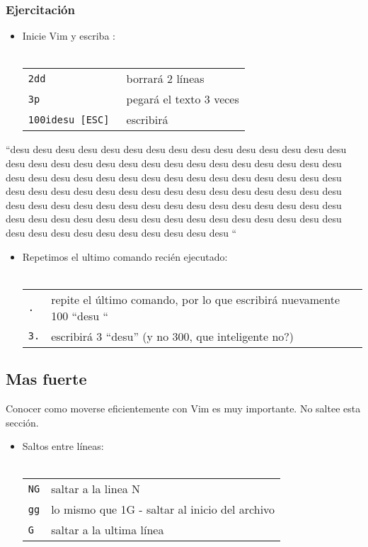 \documentclass[12pt]{article}
\begin{document}
\subsubsection{Ejercitación}


\begin{itemize}
	\item Inicie Vim y escriba : \\ \\
\begin{tabular}{ l l }
	\texttt{2dd} & borrará 2 líneas \\
	\texttt{3p} & pegará el texto 3 veces \\
	\texttt{100idesu [ESC] } & escribirá \\
\end{tabular}
\end{itemize}
“desu desu desu desu desu desu desu desu desu desu desu desu desu desu desu desu desu desu desu desu desu desu desu desu desu desu desu desu desu desu desu desu desu desu desu desu desu desu desu desu desu desu desu desu desu desu desu desu desu desu desu desu desu desu desu desu desu desu desu desu desu desu desu desu desu desu desu desu desu desu desu desu desu desu desu desu desu desu desu desu desu desu desu desu desu desu desu desu desu desu desu desu desu desu desu desu desu desu desu desu “
\begin{itemize}
	\item Repetimos el ultimo comando recién ejecutado: \\ \\
\begin{tabular}{ l l }
	\texttt{.} & repite el último comando, por lo que escribirá nuevamente 100 “desu “ \\
	\texttt{3.} & escribirá 3 “desu” (y no 300, que inteligente no?) \\
\end{tabular}
\end{itemize}



\subsection{Mas fuerte}

Conocer como moverse eficientemente con Vim es muy importante. No saltee esta
sección.

\begin{itemize}
	\item Saltos entre líneas:  \\ \\
\begin{tabular}{ l l }
	\texttt{NG} & saltar a la linea N \\
	\texttt{gg} & lo mismo que 1G - saltar al inicio del archivo \\
	\texttt{G} & saltar a la ultima línea \\
\end{tabular}
\end{itemize}
\end{document}
